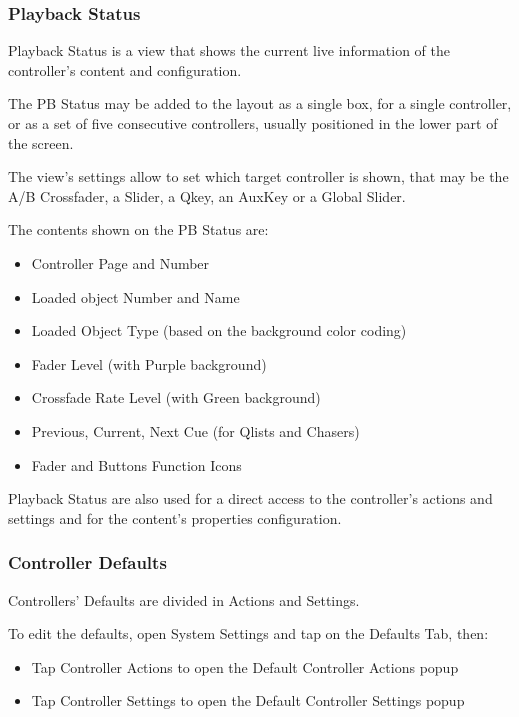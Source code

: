 \documentclass[
]{article}
\begin{document}
\hypertarget{playback-status}{%
\subsubsection{Playback Status}\label{playback-status}}

Playback Status is a view that shows the current live information of the controller's content and configuration.

The PB Status may be added to the layout as a single box, for a single controller, or as a set of five consecutive controllers, usually positioned in the lower part of the screen.

The view's settings allow to set which target controller is shown, that may be the A/B Crossfader, a Slider, a Qkey, an AuxKey or a Global Slider.

The contents shown on the PB Status are:

\begin{itemize}
\item
  Controller Page and Number
\item
  Loaded object Number and Name
\item
  Loaded Object Type (based on the background color coding)
\item
  Fader Level (with Purple background)
\item
  Crossfade Rate Level (with Green background)
\item
  Previous, Current, Next Cue (for Qlists and Chasers)
\item
  Fader and Buttons Function Icons
\end{itemize}

Playback Status are also used for a direct access to the controller's actions and settings and for the content's properties configuration.

\hypertarget{controller-defaults}{%
\subsubsection{Controller Defaults}\label{controller-defaults}}

Controllers' Defaults are divided in Actions and Settings.

To edit the defaults, open System Settings and tap on the Defaults Tab, then:

\begin{itemize}
\item
  Tap Controller Actions to open the Default Controller Actions popup
\item
  Tap Controller Settings to open the Default Controller Settings popup
\end{itemize}
\end{document}
